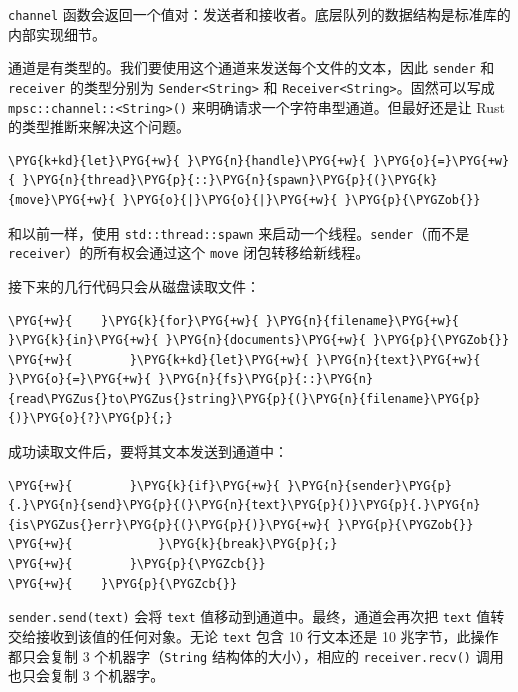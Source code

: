 \texttt{channel} 函数会返回一个值对：发送者和接收者。底层队列的数据结构是标准库的内部实现细节。

通道是有类型的。我们要使用这个通道来发送每个文件的文本，因此 \texttt{sender} 和 \texttt{receiver} 的类型分别为 \texttt{Sender<String>} 和 \texttt{Receiver<String>}。固然可以写成 \texttt{mpsc::channel::<String>()} 来明确请求一个字符串型通道。但最好还是让 Rust 的类型推断来解决这个问题。

\begin{Verbatim}[commandchars=\\\{\},breaklines=true,breakanywhere=true,fontsize=\codefont,xleftmargin=17bp]
\PYG{k+kd}{let}\PYG{+w}{ }\PYG{n}{handle}\PYG{+w}{ }\PYG{o}{=}\PYG{+w}{ }\PYG{n}{thread}\PYG{p}{::}\PYG{n}{spawn}\PYG{p}{(}\PYG{k}{move}\PYG{+w}{ }\PYG{o}{|}\PYG{o}{|}\PYG{+w}{ }\PYG{p}{\PYGZob{}}
\end{Verbatim}

和以前一样，使用 \texttt{std::thread::spawn} 来启动一个线程。\texttt{sender}（而不是 \texttt{receiver}）的所有权会通过这个 \texttt{move} 闭包转移给新线程。

接下来的几行代码只会从磁盘读取文件：

\begin{Verbatim}[commandchars=\\\{\},breaklines=true,breakanywhere=true,fontsize=\codefont,xleftmargin=17bp]
\PYG{+w}{    }\PYG{k}{for}\PYG{+w}{ }\PYG{n}{filename}\PYG{+w}{ }\PYG{k}{in}\PYG{+w}{ }\PYG{n}{documents}\PYG{+w}{ }\PYG{p}{\PYGZob{}}
\PYG{+w}{        }\PYG{k+kd}{let}\PYG{+w}{ }\PYG{n}{text}\PYG{+w}{ }\PYG{o}{=}\PYG{+w}{ }\PYG{n}{fs}\PYG{p}{::}\PYG{n}{read\PYGZus{}to\PYGZus{}string}\PYG{p}{(}\PYG{n}{filename}\PYG{p}{)}\PYG{o}{?}\PYG{p}{;}
\end{Verbatim}

成功读取文件后，要将其文本发送到通道中：

\begin{Verbatim}[commandchars=\\\{\},breaklines=true,breakanywhere=true,fontsize=\codefont,xleftmargin=17bp]
\PYG{+w}{        }\PYG{k}{if}\PYG{+w}{ }\PYG{n}{sender}\PYG{p}{.}\PYG{n}{send}\PYG{p}{(}\PYG{n}{text}\PYG{p}{)}\PYG{p}{.}\PYG{n}{is\PYGZus{}err}\PYG{p}{(}\PYG{p}{)}\PYG{+w}{ }\PYG{p}{\PYGZob{}}
\PYG{+w}{            }\PYG{k}{break}\PYG{p}{;}
\PYG{+w}{        }\PYG{p}{\PYGZcb{}}
\PYG{+w}{    }\PYG{p}{\PYGZcb{}}
\end{Verbatim}

\texttt{sender.send(text)} 会将 \texttt{text} 值移动到通道中。最终，通道会再次把 \texttt{text} 值转交给接收到该值的任何对象。无论 \texttt{text} 包含 10 行文本还是 10 兆字节，此操作都只会复制 3 个机器字（\texttt{String} 结构体的大小），相应的 \texttt{receiver.recv()} 调用也只会复制 3 个机器字。


